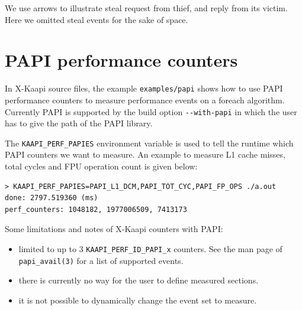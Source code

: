 \documentclass{article}[12pt]
\newcommand{\kaapi}{\textsc{X}-Kaapi\xspace}
\begin{document}
We use arrows to illustrate steal request from thief, and reply from its victim. Here we omitted steal events for the sake of space.

\section{PAPI performance counters}\label{sec:papi}

In \kaapi source files, the example \verb+examples/papi+ shows how to use PAPI
performance counters to measure performance events on a foreach algorithm.
Currently PAPI is supported by the build option \verb+--with-papi+ in which the user
has to give the path of the PAPI library.

The \verb+KAAPI_PERF_PAPIES+ environment variable is used to tell the runtime
which PAPI counters we want to measure. 
An example to measure L1 cache misses, total cycles and FPU operation count is given below:
\begin{verbatim}
> KAAPI_PERF_PAPIES=PAPI_L1_DCM,PAPI_TOT_CYC,PAPI_FP_OPS ./a.out
done: 2797.519360 (ms)
perf_counters: 1048182, 1977006509, 7413173
\end{verbatim}

Some limitations and notes of \kaapi counters with PAPI:
\begin{itemize}
\item limited to up to 3 \verb+KAAPI_PERF_ID_PAPI_x+ counters. See
the man page of \verb+papi_avail(3)+ for a list of supported events.
\item there is currently no way for the user to define measured sections.
\item it is not possible to dynamically change the event set to measure.
\end{itemize}
\end{document}
